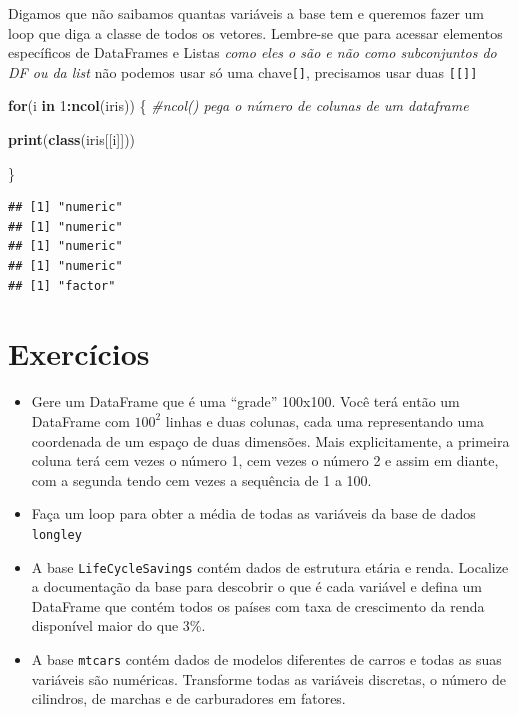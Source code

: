 \documentclass[
]{article}
\newenvironment{Shaded}{\begin{snugshade}}{\end{snugshade}}
\newcommand{\CommentTok}[1]{\textcolor[rgb]{0.56,0.35,0.01}{\textit{#1}}}
\newcommand{\ControlFlowTok}[1]{\textcolor[rgb]{0.13,0.29,0.53}{\textbf{#1}}}
\newcommand{\DecValTok}[1]{\textcolor[rgb]{0.00,0.00,0.81}{#1}}
\newcommand{\KeywordTok}[1]{\textcolor[rgb]{0.13,0.29,0.53}{\textbf{#1}}}
\newcommand{\NormalTok}[1]{#1}
\newcommand{\OperatorTok}[1]{\textcolor[rgb]{0.81,0.36,0.00}{\textbf{#1}}}
\providecommand{\tightlist}{%
  \setlength{\itemsep}{0pt}\setlength{\parskip}{0pt}}
\begin{document}
Digamos que não saibamos quantas variáveis a base tem e queremos fazer
um loop que diga a classe de todos os vetores. Lembre-se que para
acessar elementos específicos de DataFrames e Listas \emph{como eles o
são e não como subconjuntos do DF ou da list} não podemos usar só uma
chave\texttt{{[}{]}}, precisamos usar duas \texttt{{[}{[}{]}{]}}

\begin{Shaded}
\begin{Highlighting}[]
\ControlFlowTok{for}\NormalTok{(i }\ControlFlowTok{in} \DecValTok{1}\OperatorTok{:}\KeywordTok{ncol}\NormalTok{(iris)) \{ }\CommentTok{#ncol() pega o número de colunas de um dataframe}
  
  \KeywordTok{print}\NormalTok{(}\KeywordTok{class}\NormalTok{(iris[[i]]))}
  
\NormalTok{\}}
\end{Highlighting}
\end{Shaded}

\begin{verbatim}
## [1] "numeric"
## [1] "numeric"
## [1] "numeric"
## [1] "numeric"
## [1] "factor"
\end{verbatim}

\hypertarget{exercuxedcios-1}{%
\section{Exercícios}\label{exercuxedcios-1}}

\begin{itemize}
\tightlist
\item
  Gere um DataFrame que é uma ``grade'' 100x100. Você terá então um
  DataFrame com \(100^2\) linhas e duas colunas, cada uma representando
  uma coordenada de um espaço de duas dimensões. Mais explicitamente, a
  primeira coluna terá cem vezes o número 1, cem vezes o número 2 e
  assim em diante, com a segunda tendo cem vezes a sequência de 1 a 100.
\item
  Faça um loop para obter a média de todas as variáveis da base de dados
  \texttt{longley}
\item
  A base \texttt{LifeCycleSavings} contém dados de estrutura etária e
  renda. Localize a documentação da base para descobrir o que é cada
  variável e defina um DataFrame que contém todos os países com taxa de
  crescimento da renda disponível maior do que 3\%.
\item
  A base \texttt{mtcars} contém dados de modelos diferentes de carros e
  todas as suas variáveis são numéricas. Transforme todas as variáveis
  discretas, o número de cilindros, de marchas e de carburadores em
  fatores.
\end{itemize}
\end{document}
